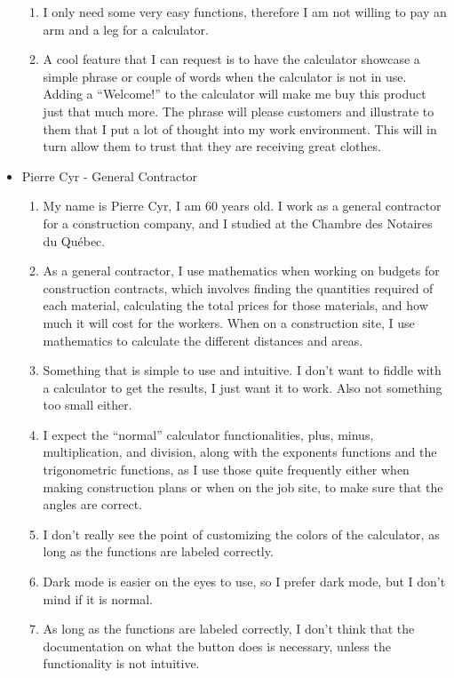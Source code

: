 \begin{itemize}
\begin{enumerate}
                        \item I only need some very easy functions, therefore I am not willing to pay an arm and a leg for a calculator.
                        \item A cool feature that I can request is to have the calculator showcase a simple phrase or couple of words when the calculator is not in use. Adding a “Welcome!” to the calculator will make me buy this product just that much more. The phrase will please customers and illustrate to them that I put a lot of thought into my work environment. This will in turn allow them to trust that they are receiving great clothes.
                    \end{enumerate}
                \item Pierre Cyr - General Contractor
                    \begin{enumerate}
                        \item My name is Pierre Cyr, I am 60 years old. I work as a general contractor for a construction company, and I studied at the Chambre des Notaires du Québec.
                        \item As a general contractor, I use mathematics when working on budgets for construction contracts, which involves finding the quantities required of each material, calculating the total prices for those materials, and how much it will cost for the workers. When on a construction site, I use mathematics to calculate the different distances and areas.
                        \item Something that is simple to use and intuitive. I don’t want to fiddle with a calculator to get the results, I just want it to work. Also not something too small either.
                        \item I expect the “normal” calculator functionalities, plus, minus, multiplication, and division, along with the exponents functions and the trigonometric functions, as I use those quite frequently either when making construction plans or when on the job site, to make sure that the angles are correct.
                        \item I don’t really see the point of customizing the colors of the calculator, as long as the functions are labeled correctly.
                        \item Dark mode is easier on the eyes to use, so I prefer dark mode, but I don’t mind if it is normal.
                        \item As long as the functions are labeled correctly, I don’t think that the documentation on what the button does is necessary, unless the functionality is not intuitive.

\end{enumerate}
\end{itemize}

